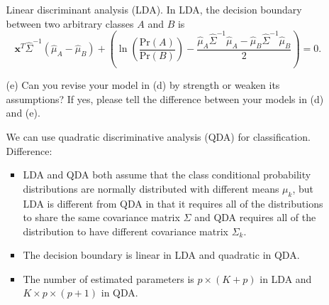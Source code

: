 \documentclass[10pt]{article}
\newcommand{\pr}[1]{\text{Pr} #1}
\begin{document}
\begin{enumerate}[1.]
\begin{itemize}
                    { \color{blue}
                    Linear discriminant analysis (LDA). In LDA, the decision boundary between two arbitrary classes $A$ and $B$ is
                    $$
                        \textbf{x}^T\hat\Sigma^{-1}(\hat\mu_A-\hat\mu_B)+\left(\ln(\dfrac{\pr (A)}{\pr (B)})-\dfrac{\hat{\mu}_A\hat\Sigma^{-1}\hat{\mu}_A-\hat{\mu}_B\hat\Sigma^{-1}\hat{\mu}_B}{2}\right) = 0.
                    $$
                    }
              \item[(e)] Can you revise your model in (d) by strength or weaken its assumptions? If yes, please tell the difference between your models in (d) and (e). ~\\
                    {\color{blue}
                    We can use quadratic discriminative analysis (QDA) for classification.\\
                    Difference:
                    \begin{itemize}
                        \item LDA and QDA both assume that the class conditional probability distributions are normally distributed with different means $\mu_k$,
                              but LDA is different from QDA in that it requires all of the distributions to share the same covariance matrix $\Sigma$
                              and QDA requires all of the distribution to have different covariance matrix $\Sigma_k$.
                        \item The decision boundary is linear in LDA and quadratic in QDA.
                        \item The number of estimated parameters is $p \times (K+p)$ in LDA and
                              $K \times p \times (p+1)$ in QDA.
                    \end{itemize}
                    }
          \end{itemize}




\end{enumerate}
\end{document}
